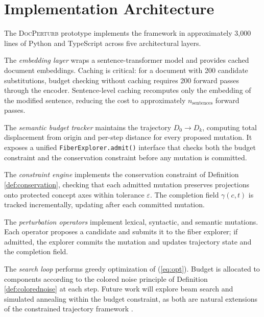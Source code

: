 \documentclass[12pt, a4paper]{article}
\theoremstyle{plain}
\theoremstyle{definition}
\theoremstyle{remark}
\newcommand{\ve}{\varepsilon}
\begin{document}
\section{Implementation Architecture}
\label{sec:implementation}

The \textsc{DocPerturb} prototype implements the framework in approximately 3,000
lines of Python and TypeScript across five architectural layers.

The \emph{embedding layer} wraps a sentence-transformer model
\cite{reimers2019sentencebert} and provides cached document embeddings.
Caching is critical: for a document with 200 candidate substitutions, budget
checking without caching requires 200 forward passes through the encoder.
Sentence-level caching recomputes only the embedding of the modified sentence,
reducing the cost to approximately $n_{\mathrm{sentences}}$ forward passes.

The \emph{semantic budget tracker} maintains the trajectory $D_0 \to D_k$,
computing total displacement from origin and per-step distance for every
proposed mutation.  It exposes a unified \texttt{FiberExplorer.admit()}
interface that checks both the budget constraint and the conservation
constraint before any mutation is committed.

The \emph{constraint engine} implements the conservation constraint of
Definition \ref{def:conservation}, checking that each admitted mutation
preserves projections onto protected concept axes within tolerance $\ve$.
The completion field $\gamma(c, t)$ is tracked incrementally, updating after
each committed mutation.

The \emph{perturbation operators} implement lexical, syntactic, and semantic
mutations.  Each operator proposes a candidate and submits it to the fiber
explorer; if admitted, the explorer commits the mutation and updates trajectory
state and the completion field.

The \emph{search loop} performs greedy optimization of (\ref{eq:opt}).
Budget is allocated to components according to the colored noise principle
of Definition \ref{def:colorednoise} at each step.  Future work will explore
beam search and simulated annealing within the budget constraint, as both
are natural extensions of the constrained trajectory framework
\cite{bertsekas1995dynamic}.


\end{document}
